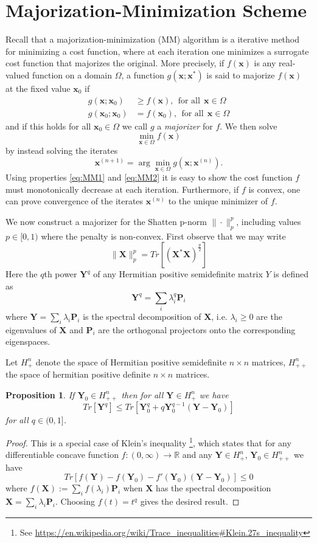 \documentclass[10pt, twocolumn, twoside]{IEEEtran}
\newcommand{\mbf}{\mathbf}
\newtheorem{proposition}{Proposition}
\begin{document}
\section{Majorization-Minimization Scheme}
Recall that a majorization-minimization (MM) algorithm is a iterative method for minimizing a cost function, where at each iteration one minimizes a surrogate cost function that majorizes the original. More precisely, if $f(\mbf x)$ is any real-valued function on a domain $\Omega$, a function $g(\mbf x;\mbf x^*)$ is said to majorize $f(\mbf x)$ at the fixed value $\mbf x_0$ if
\begin{align}\label{eq:MM1}
g(\mbf x; \mbf x_0) & \geq f(\mbf x),~~\text{for all}~~\mbf x \in \Omega\\
g(\mbf x_0; \mbf x_0) & = f(\mbf x_0),~~\text{for all}~~\mbf x \in \Omega
\label{eq:MM2}
\end{align}
and if this holds for all $\mbf x_0 \in \Omega$ we call $g$ a \emph{majorizer} for $f$. We then solve 
\[
\min_{\mbf x \in \Omega} f(\mbf x)
\]
by instead solving the iterates
\[
\mbf x^{(n+1)} = \arg\min_{\mbf x \in \Omega} g(\mbf x;\mbf x^{(n)}).
\]
Using properties \eqref{eq:MM1} and \eqref{eq:MM2} it is easy to show the cost function $f$ must monotonically decrease at each iteration. Furthermore, if $f$ is convex, one can prove convergence of the iterates $\mbf x^{(n)}$ to the unique minimizer of $f$.

We now construct a majorizer for the Shatten p-norm $\|\cdot\|^p_p$, including values $p \in [0,1)$ where the penalty is non-convex. First observe that we may write
\[
\|\mbf X\|^p_p = Tr[(\mbf X^*\mbf X)^{\frac{p}{2}}]
\]
Here the $q$th power $\mbf Y^q$ of any Hermitian positive semidefinite matrix $Y$ is defined as
\[
\mbf Y^q = \sum_i \lambda_i^q \mbf P_i 
\]
where $\mbf Y = \sum_i\lambda_i \mbf P_i$ is the spectral decomposition of $\mbf X$, i.e. $\lambda_i \geq 0$ are the eigenvalues of $\mbf X$ and $\mbf P_i$ are the orthogonal projectors onto the corresponding eigenspaces.

Let $H^n_+$ denote the space of Hermitian positive semidefinite $n\times n$ matrices, $H^n_{++}$ the space of hermitian positive definite $n\times n$ matrices.
\begin{proposition}
 If $\mbf Y_0 \in H^n_{++}$ then for all $\mbf Y \in H^n_+$ we have
 \[
 Tr[\mbf Y^{q}] \leq Tr[\mbf Y_0^q + q \mbf Y_0^{q-1}(\mbf Y -\mbf Y_0)]
 \]
 for all $q \in (0, 1]$.
 \label{prop:maj}
\end{proposition}
\begin{proof}
This is a special case of Klein's inequality \footnote{See \url{https://en.wikipedia.org/wiki/Trace_inequalities\#Klein.27s_inequality}}, which states that for any differentiable concave function ${f:(0,\infty)\rightarrow\mathbb{R}}$ and any $\mbf Y \in H^n_+$, $\mbf Y_0\in H^n_{++}$ we have
\begin{equation}
Tr[f(\mbf Y)-f(\mbf Y_0)-f'(\mbf Y_0)(\mbf Y-\mbf Y_0)] \leq 0
\label{eq:traceineq}
\end{equation}
where $f(\mbf X) := \sum_i f(\lambda_i)\mbf P_i$ when $\mbf X$ has the spectral decomposition $\mbf X = \sum_i\lambda_i \mbf P_i$. Choosing $f(t)=t^q$ gives the desired result.
\end{proof}
\end{document}
